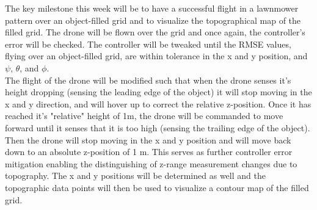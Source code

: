 The key milestone this week will be to have a successful flight in a lawnmower pattern over an object-filled grid and to visualize the topographical map of the filled grid. The drone will be flown over the grid and once again, the controller's error will be checked. The controller will be tweaked until the RMSE values, flying over an object-filled grid, are within tolerance in the x and y position, and $\psi$, $\theta$, and $\phi$.\\
\indent The flight of the drone will be modified such that when the drone senses it's height dropping (sensing the leading edge of the object) it will stop moving in the x and y direction, and will hover up to correct the relative z-position. Once it has reached it's "relative" height of 1m, the drone will be commanded to move forward until it senses that it is too high (sensing the trailing edge of the object). Then the drone will stop moving in the x and y position and will move back down to an absolute z-position of 1 m. This serves as further controller error mitigation enabling the distinguishing of z-range measurement changes due to topography. The x and y positions will be determined as well and the topographic data points will then be used to visualize a contour map of the filled grid. 

